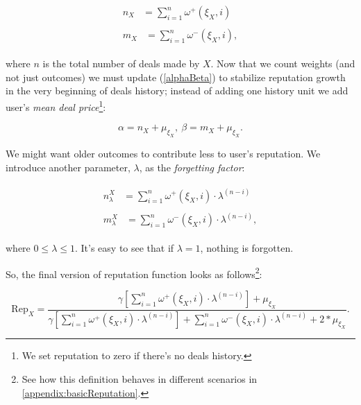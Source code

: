 \documentclass[11pt]{article}
\begin{document}
\begin{align}
\begin{split}
n_{X} {} & = \sum_{i = 1}^{n} \omega^{+}(\xi_X, i)
\end{split} \\
\begin{split}
m_{X} {}& = \sum_{i = 1}^{n} \omega^{-}(\xi_X, i),
\end{split}
\end{align}

where $ n $ is the total number of deals made by $ X $. Now that we count weights (and not just outcomes) we must update (\ref{alphaBeta}) to stabilize reputation growth in the very beginning of deals history; instead of adding one history unit we add user's \textit{mean deal price}\footnote{We set reputation to zero if there's no deals history.}:

\begin{equation} \label{alphaBetaRefined}
\alpha = n_{X} + \mu_{\xi_X},\ \beta = m_{X} + \mu_{\xi_X}.
\end{equation}

We might want older outcomes to contribute less to user's reputation. We introduce another parameter, $ \lambda $, as the \textit{forgetting factor}:

\begin{align}
\begin{split}
n_{\lambda}^{X} {}& = \sum_{i = 1}^{n} \omega^{+}(\xi_X, i) \cdot \lambda^{(n - i)}
\end{split} \\
\begin{split}
m_{\lambda}^{X} {}& = \sum_{i = 1}^{n} \omega^{-}(\xi_X, i) \cdot \lambda^{(n - i)},
\end{split}
\end{align}

where $ 0 \leq \lambda \leq 1 $. It's easy to see that if $ \lambda = 1 $, nothing is forgotten.

So, the final version of reputation function looks as follows\footnote{See how this definition behaves in different scenarios in \ref{appendix:basicReputation}.}:

\begin{equation} \label{reputationFunctionRefined}
\text{Rep}_{X} = \frac{\gamma[\sum_{i = 1}^{n} \omega^{+}(\xi_X, i) \cdot \lambda^{(n - i)}] + \mu_{\xi_X}}{\gamma[\sum_{i = 1}^{n} \omega^{+}(\xi_X, i) \cdot \lambda^{(n - i)}] + \sum_{i = 1}^{n} \omega^{-}(\xi_X, i) \cdot \lambda^{(n - i)} + 2 * \mu_{\xi_X}}.
\end{equation}
\end{document}
